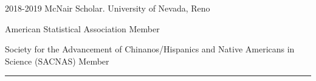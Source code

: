 \documentclass{article}
\begin{document}


\begin{description}
	\vspace{-2mm}
	\item[Programs and Professional Membership]\hspace*{.01in}
		
		2018-2019 McNair Scholar. University of Nevada, Reno
		\vspace*{1mm}
		
		American Statistical Association Member
		\vspace*{1mm}
		
		Society for the Advancement of Chinanos/Hispanics and Native Americans in Science (SACNAS) Member
		
\end{description}
\vspace{-2mm}
\rule{\linewidth}{1pt}


\end{document}
